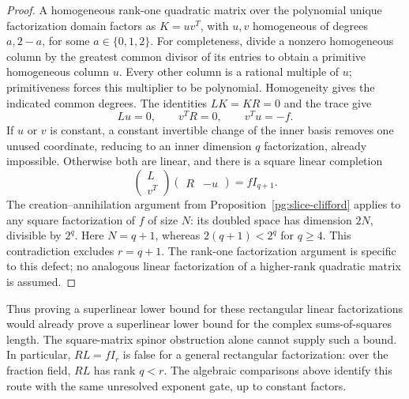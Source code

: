 \begin{proof}
A homogeneous rank-one quadratic matrix over the polynomial
unique factorization domain factors as $K=uv^T$, with $u,v$
homogeneous of degrees $a,2-a$, for some $a\in\{0,1,2\}$.
For completeness, divide a nonzero homogeneous column by the
greatest common divisor of its entries to obtain a primitive
homogeneous column $u$. Every other column is a rational multiple
of $u$; primitiveness forces this multiplier to be polynomial.
Homogeneity gives the indicated common degrees.
The identities $LK=KR=0$ and the trace give
\[
 Lu=0,\qquad v^TR=0,\qquad v^Tu=-f.
\]
If $u$ or $v$ is constant, a constant invertible change of the
inner basis removes one unused coordinate, reducing to an inner
dimension $q$ factorization, already impossible. Otherwise both
are linear, and there is a square linear completion
\[
 \begin{pmatrix}L\\v^T\end{pmatrix}
 \begin{pmatrix}R&-u\end{pmatrix}
 =fI_{q+1}.
\]
The creation--annihilation argument from
Proposition~\ref{pg:slice-clifford} applies to any square
factorization of $f$ of size $N$: its doubled space has dimension
$2N$, divisible by $2^q$. Here $N=q+1$, whereas
$2(q+1)<2^q$ for $q\geq4$. This contradiction excludes $r=q+1$.
The rank-one factorization argument is specific to this defect;
no analogous linear factorization of a higher-rank quadratic
matrix is assumed.
\end{proof}

Thus proving a superlinear lower bound for these rectangular
linear factorizations would already prove a superlinear lower
bound for the complex sums-of-squares length. The square-matrix
spinor obstruction alone cannot supply such a bound. In
particular, $RL=fI_r$ is false for a general rectangular
factorization: over the fraction field, $RL$ has rank $q<r$.
The algebraic comparisons above identify this route with the
same unresolved exponent gate, up to constant factors.

